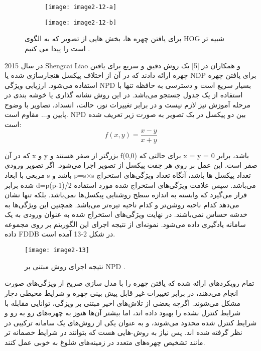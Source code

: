 \begin{figure}
\begin{subfigure}{.5\textwidth}
  \centering
  \texttt{[image: image2-12-a]}
  \label{image2-12-a}
\end{subfigure}
\begin{subfigure}{.5\textwidth}
  \centering
  \texttt{[image: image2-12-b]}
  \label{image2-12-b}
\end{subfigure}
  \caption{براى يافتن چهره ها، بخش هايى از تصوير كه به الگوى HOG شبيه تر است را پيدا می كنيم \cite{ref1}.}
\label{fig:image2-12}
\end{figure}

در سال 2015 Shengcai Liao و همکاران در [5] یک روش دقیق و سریع برای یافتن چهره ارائه دادند که در آن از اختلاف پیکسل هنجارسازی شده یا NDP برای یافتن چهره استفاده می‌شود. ارزیابی ویژگی NPD بسیار سریع است و دسترسی به حافظه تنها با استفاده از یک جدول جستجو می‌باشد. در این روش نشانه گذاری یا خوشه بندی در مرحله آموزش نیز لازم نیست و در برابر تغییرات نور، حالت، انسداد، تصاویر با وضوح پایین و... مقاوم است. NPD بین دو پیکسل در یک تصویر به صورت زیر تعریف شده است:
\begin{equation}\label{eq2-6}
f(x,y) = \frac{x - y}{x + y}
\end{equation}

که در آن x و  y بزرگتر از صفر هستند و f(0,0) برای حالتی که x = y = 0 باشد، برابر صفر است. این عمل بر روی هر جفت پیکسل از تصویر اجرا می‌شود. اگر تصویر ورودی مربعی با ابعاد s باشد و p=s×s تعداد پیکسل-ها باشد، آنگاه تعداد ویژگی‌های استخراج شده برابر d=p(p-1)/2 می‌باشد. سپس علامت  ویژگی‌های استخراج شده مورد استفاده قرار می‌گیرد که وابسته به اندازه سطح روشنایی پیکسل‌ها نمی‌باشد. بلکه تنها نشان می‌دهد کدام ناحیه روشن‌تر و کدام ناحیه تیره‌تر می‌باشد. همچنین این ویژگی‌ها به خدشه  حساس نمی‌باشند. در نهایت ویژگی‌های استخراج شده به عنوان ورودی به یک سامانه یادگیری داده می‌شود. نمونه‌ای از نتیجه اجرای این الگوریتم بر روی مجموعه داده FDDB در شکل 2-13 آمده است.
 
 \begin{figure}[h]
\centering
  \texttt{[image: image2-13]}
  \caption{نتیجه اجرای روش مبتنی بر NPD \cite{ref1}.}
  \label{image2-13}
\end{figure}

تمام رویکرد‌های ارائه شده که یافتن چهره را با مدل سازی صریح از ویژگی‌های صورت انجام می‌دهند، در برابر تغییرات غیر قابل پیش بینی چهره و شرایط محیطی دچار مشکل می‌شوند. اگرچه بعضی از تلاش‌های اخیر مبتنی بر ویژگی، توانایی مقابله با شرایط کنترل نشده را بهبود داده اند، اما بیشتر آن‌ها هنوز به چهره‌های رو به رو و شرایط کنترل شده محدود می‌شوند، و به عنوان یکی از روش‌های یک سامانه ترکیبی در نظر گرفته شده اند. پس نیاز به روش-هایی هست که بتوانند در شرایط خصمانه تر مانند تشخیص چهره‌های متعدد در زمینه‌های شلوغ به خوبی عمل کنند.

